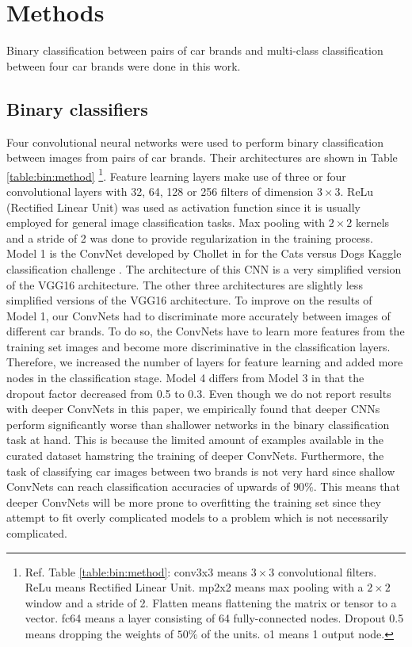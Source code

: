 \documentclass[conference]{IEEEtran}
\begin{document}
\section{Methods} \label{section:methods}
Binary classification between pairs of car brands and multi-class classification between four car brands were done in this work.

\subsection{Binary classifiers}
Four convolutional neural networks were used to perform binary classification between images from pairs of car brands. Their architectures are shown in Table \ref{table:bin:method} \footnote{Ref. Table \ref{table:bin:method}: conv3x3 means $3 \times 3$ convolutional filters. ReLu means Rectified Linear Unit. mp2x2 means max pooling with a $2\times2$ window and a stride of 2. Flatten means flattening the matrix or tensor to a vector. fc64 means a layer consisting of 64 fully-connected nodes. Dropout 0.5 means dropping the weights of $50\%$ of the units. o1 means 1 output node.}. Feature learning layers make use of three or four convolutional layers with 32, 64, 128 or 256 filters of dimension $3 \times 3$. ReLu (Rectified Linear Unit) was used as activation function since it is usually employed for general image classification tasks. Max pooling with $2 \times 2$ kernels and a stride of 2 was done to provide regularization in the training process. Model 1 is the ConvNet developed by Chollet in \cite{chollet2018deep} for the Cats versus Dogs Kaggle classification challenge \cite{kagcatdog}. The architecture of this CNN is a very simplified version of the VGG16 architecture. The other three architectures are slightly less simplified versions of the VGG16 architecture. To improve on the results of Model 1, our ConvNets had to discriminate more accurately between images of different car brands. To do so, the ConvNets have to learn more features from the training set images and become more discriminative in the classification layers. Therefore, we increased the number of layers for feature learning and added more nodes in the classification stage. Model 4 differs from Model 3 in that the dropout factor decreased from 0.5 to 0.3. Even though we do not report results with deeper ConvNets in this paper, we empirically found that deeper CNNs perform significantly worse than shallower networks in the binary classification task at hand.
This is because the limited amount of examples available in the curated dataset hamstring the training of deeper ConvNets. Furthermore, the task of classifying car images between two brands is not very hard since shallow ConvNets can reach classification accuracies of upwards of $90\%$. This means that deeper ConvNets will be more prone to overfitting the training set since they attempt to fit overly complicated models to a problem which is not necessarily complicated.
\end{document}
